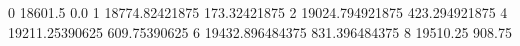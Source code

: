 0 18601.5 0.0
1 18774.82421875 173.32421875
2 19024.794921875 423.294921875
4 19211.25390625 609.75390625
6 19432.896484375 831.396484375
8 19510.25 908.75
